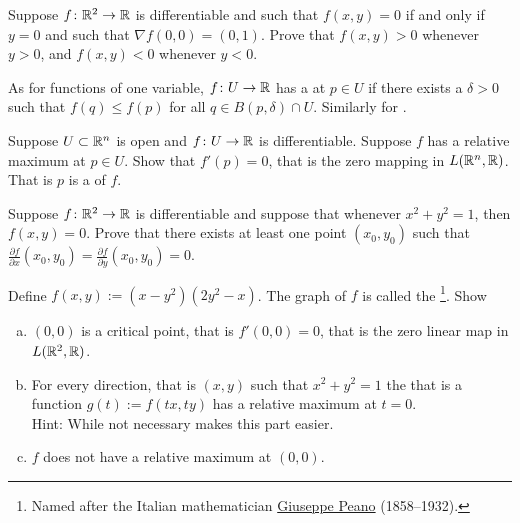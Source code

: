 \begin{exercise}
Suppose $f \colon {\mathbb{R}}^2 \to {\mathbb{R}}$ is differentiable and such that
$f(x,y) = 0$ if and only if $y=0$ and such that $\nabla f(0,0) = (0,1)$.
Prove that $f(x,y) > 0$ whenever $y > 0$, and
$f(x,y) < 0$ whenever $y < 0$.
\end{exercise}

\pagebreak[2]
\begin{exnote}
As for functions of one variable, $f \colon U \to {\mathbb{R}}$ has a
\emph{} at $p \in U$ if there exists
a $\delta >0$ such that $f(q) \leq f(p)$ for all $q \in B(p,\delta) \cap U$.
Similarly for \emph{}.
\end{exnote}

\begin{exercise} \label{exercise:mv:maximumcritical}
Suppose $U \subset {\mathbb{R}}^n$ is open and
$f \colon U \to {\mathbb{R}}$ is differentiable.  Suppose $f$ has a relative maximum
at $p \in U$.  Show that $f'(p) = 0$, that is the zero mapping in
$L({\mathbb{R}}^n,{\mathbb{R}})$.  That is $p$ is a
\emph{} of $f$.
\end{exercise}

\begin{exercise}
Suppose $f \colon {\mathbb{R}}^2 \to {\mathbb{R}}$ is differentiable and suppose that
whenever $x^2+y^2 = 1$, then $f(x,y) = 0$.  Prove that there exists at least
one point $(x_0,y_0)$ such that
$\frac{\partial f}{\partial x}(x_0,y_0) = \frac{\partial f}{\partial
y}(x_0,y_0) = 0$.
\end{exercise}

\begin{exercise} \label{exercise:peano}
Define $f(x,y) := ( x-y^2 ) ( 2 y^2 - x)$.  The graph of $f$ is called
the \emph{}%
\footnote{Named after the Italian mathematician
\href{https://en.wikipedia.org/wiki/Giuseppe_Peano}{Giuseppe Peano}
(1858--1932).}.
Show
\begin{enumerate}[a)]
\item
$(0,0)$ is a critical point, that is $f'(0,0) = 0$, that is the zero
linear map in $L({\mathbb{R}}^2,{\mathbb{R}})$.
\item
For every direction, that is $(x,y)$ such that $x^2+y^2=1$ the
 that is a function $g(t) := f(tx,ty)$ has a relative maximum at
$t=0$.\\
Hint: While not necessary
makes
this part easier.
\item
$f$ does not have a relative maximum at $(0,0)$.
\end{enumerate}
\end{exercise}

